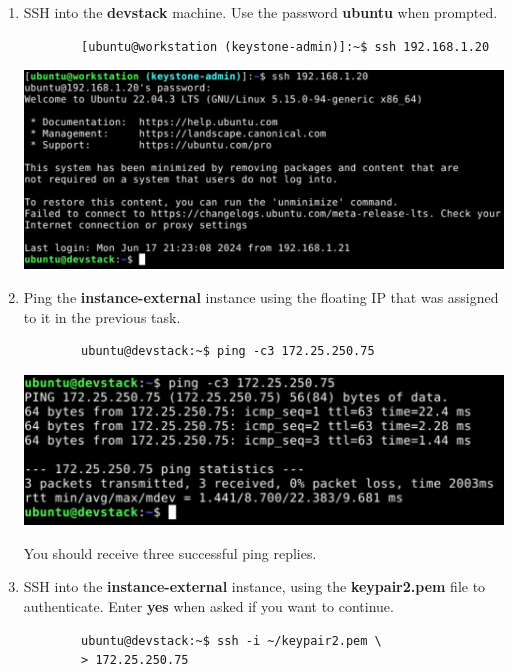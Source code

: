 \documentclass[letterpaper, 12pt]{article}
\begin{document}
\begin{enumerate}
    \item SSH into the \textbf{devstack} machine. Use the password \textbf{ubuntu} when prompted.
    \begin{lstlisting}
        [ubuntu@workstation (keystone-admin)]:~$ ssh 192.168.1.20
    \end{lstlisting}

    \begin{center}
        \includegraphics[width=\linewidth]{images/part6/step8.png}
    \end{center}

    \item Ping the \textbf{instance-external} instance using the floating IP that was assigned to it in the previous
    task.
    \begin{lstlisting}
        ubuntu@devstack:~$ ping -c3 172.25.250.75
    \end{lstlisting}

    \begin{center}
        \includegraphics[width=\linewidth]{images/part6/step9.png}
    \end{center}

    \begin{notebox}
        You should receive three successful ping replies.
    \end{notebox}

    \item SSH into the \textbf{instance-external} instance, using the \textbf{keypair2.pem} file to authenticate. Enter
    \textbf{yes} when asked if you want to continue.
    \begin{lstlisting}
        ubuntu@devstack:~$ ssh -i ~/keypair2.pem \
        > 172.25.250.75
    \end{lstlisting}
 

\end{enumerate}
\end{document}
